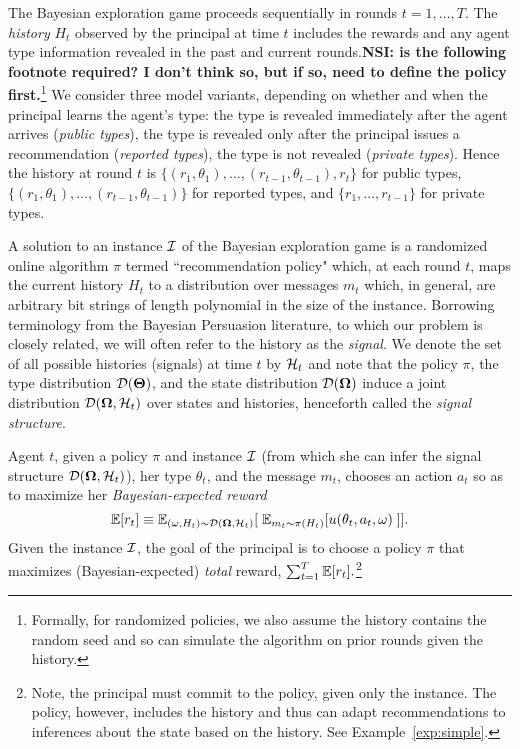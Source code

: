 The Bayesian exploration game proceeds sequentially in rounds $t=1,\ldots, T$.  The {\em history} $H_t$ observed by the principal at time $t$ includes the rewards and any agent type information revealed in the past and current rounds.{\bf NSI: is the following footnote required? I don't think so, but if so, need to define the policy first.}\footnote{Formally, for randomized policies, we also assume the history contains the random seed and so can simulate the algorithm on prior rounds given the history.} We consider three model variants, depending on whether and when the principal learns the agent's type: the type is revealed immediately after the agent arrives (\emph{public types}), the type is revealed only after the principal issues a recommendation (\emph{reported types}), the type is not revealed (\emph{private types}). Hence the history at round $t$ is $\{(r_1,\theta_1),\ldots,(r_{t-1},\theta_{t-1}),r_t\}$ for public types, $\{(r_1,\theta_1),\ldots,(r_{t-1},\theta_{t-1})\}$ for reported types, and $\{r_1,\ldots,r_{t-1}\}$ for private types.  

A solution to an instance $\mathcal{I}$ of the Bayesian exploration game is a randomized online algorithm $\pi$ termed ``recommendation policy" which, at each round $t$, maps %
the current history $H_t$ to a distribution over messages $m_t$ which, in general, are arbitrary bit strings of length polynomial in the size of the instance.  
Borrowing terminology from the Bayesian Persuasion literature, to which our problem is closely related, we will often refer to the history as the {\em signal}.  We denote the set of all possible histories (signals) at time $t$ by $\mathcal{H}_t$ and note that the policy $\pi$, the type distribution $\mathcal{D}(\bold{\Theta})$, and the state distribution $\mathcal{D}(\bold{\Omega})$ induce a joint distribution $\mathcal{D}(\bold{\Omega},\mathcal{H}_t)$ over states and histories, henceforth called the {\em signal structure}.

Agent $t$, given a policy $\pi$ and instance $\mathcal{I}$ (from which she can infer the signal structure $\mathcal{D}(\bold{\Omega},\mathcal{H}_t)$), her type $\theta_t$, and the message $m_t$, chooses an action $a_t$ so as to maximize her {\em Bayesian-expected reward}
$$\mathbb{E}[r_t]\equiv\mathbb{E}_{(\omega,H_t)\sim\mathcal{D}(\bold{\Omega},\mathcal{H}_t)}[\; \mathbb{E}_{m_t\sim\pi(H_t)}[u(\theta_t,a_t,\omega)\; ]].$$
Given the instance $\mathcal{I}$, the goal of the principal is to choose a policy $\pi$ that maximizes (Bayesian-expected) {\em total} reward, \ie $\sum_{t=1}^T \mathbb{E}[r_t].$\footnote{Note, the principal must commit to the policy, given only the instance.  The policy, however, includes the history and thus can adapt recommendations to inferences about the state based on the history.  See Example~\ref{exp:simple}.}

